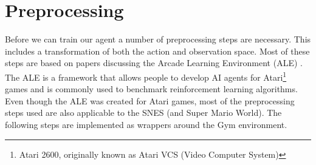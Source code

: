 \documentclass{article}
\begin{document}
    \section{Preprocessing}
    Before we can train our agent a number of preprocessing steps are necessary.
    This includes a transformation of both the action and observation space.
    Most of these steps are based on papers discussing the Arcade Learning Environment (ALE) \cite{bellemare2013arcade,machado2018revisiting}.
    The ALE is a framework that allows people to develop AI agents for Atari\footnote{Atari 2600, originally known as Atari VCS (Video Computer System)} games and is commonly used to benchmark reinforcement learning algorithms.
    Even though the ALE was created for Atari games, most of the preprocessing steps used are also applicable to the SNES (and Super Mario World).
    The following steps are implemented as wrappers around the Gym environment.
\end{document}
